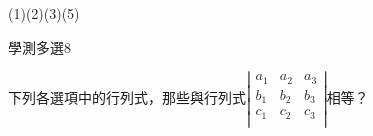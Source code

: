 \begin{QUESTIONS}
\begin{QUESTION}
\begin{QBODY}
\begin{QOPS}
            \end{QOPS}
        \end{QBODY}
        \begin{QFROMS}
        \end{QFROMS}
        \begin{QTAGS}\end{QTAGS}
        \begin{QANS}
            (1)(2)(3)(5)
        \end{QANS}
        \begin{QSOLLIST}
        \end{QSOLLIST}
        \begin{QEMPTYSPACE}
        \end{QEMPTYSPACE}
    \end{QUESTION}
    \begin{QUESTION}
        \begin{ExamInfo}{88}{學測}{多選}{8}
        \end{ExamInfo}
        \begin{ExamAnsRateInfo}{}{}{}{}
        \end{ExamAnsRateInfo}
        \begin{QBODY}
            下列各選項中的行列式，那些與行列式$\left| \begin{matrix}
                {{a}_{1}} & {{a}_{2}} & {{a}_{3}}  \\
                {{b}_{1}} & {{b}_{2}} & {{b}_{3}}  \\
                {{c}_{1}} & {{c}_{2}} & {{c}_{3}}  \\
             \end{matrix} \right|$相等？
\end{QBODY}
\end{QUESTION}
\end{QUESTIONS}
